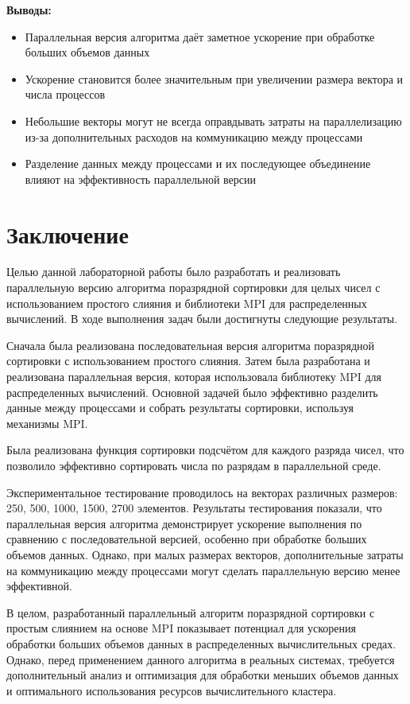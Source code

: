 \documentclass[a4paper, 14pt]{article}
\theoremstyle{plain}
\begin{document}
\textbf{Выводы:}
\vspace{-1em}
\begin{itemize}[leftmargin=3em]
	\setlength\itemsep{0cm}
	\item Параллельная версия алгоритма даёт заметное ускорение при обработке больших объемов данных
	\item Ускорение становится более значительным при увеличении размера вектора и числа процессов
	\item Небольшие векторы могут не всегда оправдывать затраты на параллелизацию из-за дополнительных расходов на коммуникацию между процессами
	\item Разделение данных между процессами и их последующее объединение влияют на эффективность параллельной версии
\end{itemize}

\newpage
\section*{\centering Заключение}

Целью данной лабораторной работы было разработать и реализовать параллельную версию алгоритма поразрядной сортировки для целых чисел с использованием простого слияния и библиотеки MPI для распределенных вычислений. В ходе выполнения задач были достигнуты следующие результаты.

Сначала была реализована последовательная версия алгоритма поразрядной сортировки с использованием простого слияния. Затем была разработана и реализована параллельная версия, которая использовала библиотеку MPI для распределенных вычислений. Основной задачей было эффективно разделить данные между процессами и собрать результаты сортировки, используя механизмы MPI.

Была реализована функция сортировки подсчётом для каждого разряда чисел, что позволило эффективно сортировать числа по разрядам в параллельной среде.

Экспериментальное тестирование проводилось на векторах различных размеров: 250, 500, 1000, 1500, 2700 элементов. Результаты тестирования показали, что параллельная версия алгоритма демонстрирует ускорение выполнения по сравнению с последовательной версией, особенно при обработке больших объемов данных. Однако, при малых размерах векторов, дополнительные затраты на коммуникацию между процессами могут сделать параллельную версию менее эффективной.

В целом, разработанный параллельный алгоритм поразрядной сортировки с простым слиянием на основе MPI показывает потенциал для ускорения обработки больших объемов данных в распределенных вычислительных средах. Однако, перед применением данного алгоритма в реальных системах, требуется дополнительный анализ и оптимизация для обработки меньших объемов данных и оптимального использования ресурсов вычислительного кластера.
\end{document}
